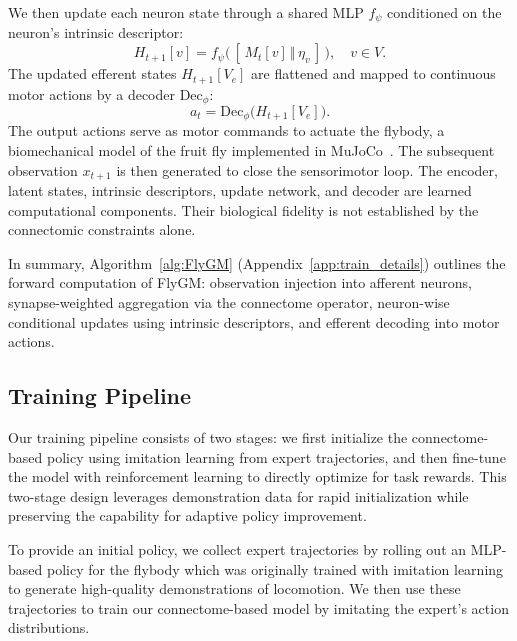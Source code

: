 \documentclass[a4paper]{easychair}
\begin{document}
We then update each neuron state through a shared MLP $f_\psi$ conditioned on the neuron's intrinsic descriptor:
\begin{equation}
H_{t+1}[v] = f_\psi\big(\,[\,M_t[v] \,\Vert\, \eta_v\,] \,\big), \quad v\in V.
\end{equation}
The updated efferent states $H_{t+1}[V_e]$ are flattened and mapped to continuous motor actions by a decoder $\mathrm{Dec}_\phi$:
\begin{equation}
a_t = \mathrm{Dec}_\phi\!\big(H_{t+1}[V_e]\big).
\end{equation}
The output actions serve as motor commands to actuate the flybody, a biomechanical model of the fruit fly implemented in MuJoCo~\citep{Vaxenburg2025}. The subsequent observation $x_{t+1}$ is then generated to close the sensorimotor loop. The encoder, latent states, intrinsic descriptors, update network, and decoder are learned computational components. Their biological fidelity is not established by the connectomic constraints alone.

In summary, Algorithm~\ref{alg:FlyGM} (Appendix~\ref{app:train_details}) outlines the forward computation of FlyGM: observation injection into afferent neurons, synapse-weighted aggregation via the connectome operator, neuron-wise conditional updates using intrinsic descriptors, and efferent decoding into motor actions.



\subsection{Training Pipeline}

Our training pipeline consists of two stages: we first initialize the connectome-based policy using imitation learning from expert trajectories, and then fine-tune the model with reinforcement learning to directly optimize for task rewards. This two-stage design leverages demonstration data for rapid initialization while preserving the capability for adaptive policy improvement.

To provide an initial policy, we collect expert trajectories by rolling out an MLP-based policy for the flybody which was originally trained with imitation learning to generate high-quality demonstrations of locomotion. We then use these trajectories to train our connectome-based model by imitating the expert's action distributions.
\end{document}

